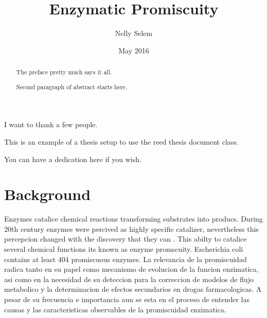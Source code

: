 \documentclass[12pt,twoside]{reedthesis}
\title{Enzymatic Promiscuity}
\author{Nelly Selem}
\date{May 2016}
\begin{document}
      \maketitle
  
  \frontmatter %
  \pagestyle{empty} %

      \begin{acknowledgements}
      I want to thank a few people.
    \end{acknowledgements}
  
      \begin{preface}
      This is an example of a thesis setup to use the reed thesis document
      class.
    \end{preface}
  
      \hypersetup{linkcolor=black}
    \setcounter{tocdepth}{2}
    \tableofcontents
  
      \listoftables
  
      \listoffigures
  
      \begin{abstract}
      The preface pretty much says it all. \par  Second paragraph of abstract
      starts here.
    \end{abstract}
  
      \begin{dedication}
      You can have a dedication here if you wish.
    \end{dedication}
  
  \mainmatter %
  \pagestyle{fancyplain} %

  \chapter*{Background}\label{background}
  
  Enzymes catalice chemical reactions transforming substrates into
  producs. During 20th century enzymes were percived as highly specific
  catalizer, nevertheless this percepcion changed with the discovery that
  they can . This abilty to catalice several chemical functions its known
  as enzyme promscuity. Escherichia coli contains at least 404 promiscuous
  enzymes. La relevancia de la promiscuidad radica tanto en su papel como
  mecanismo de evolucion de la funcion enzimatica, asi como en la
  necesidad de su deteccion para la correccion de modelos de flujo
  metabolico y la determinacion de efectos secundarios en drogas
  farmacologicas. A pesar de su frecuencia e importancia aun se esta en el
  proceso de entender las causas y las caracteristicas observables de la
  promiscuidad enzimatica.
  
\end{document}
